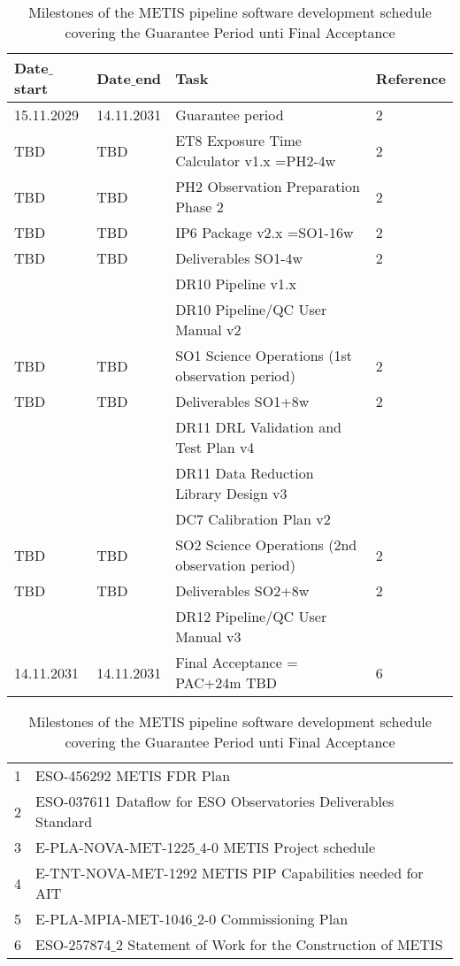 \begin{table}[h!]
    \caption[Development schedule]{Milestones of the METIS pipeline software development schedule covering the Guarantee Period unti Final Acceptance}
  \label{tab:development_schedule3}

\centering
\scriptsize
\begin{tabularx}{\textwidth}{llll}

\hline
Date$\_$start &	Date$\_$end   &	Task                            &		Reference \\
\hline\hline
15.11.2029 & 14.11.2031 & Guarantee period 					               & 2 \\
\hline
TBD    & TBD   & ET8 Exposure Time Calculator v1.x =PH2-4w		           & 2 \\
\hline
TBD    & TBD   & PH2 Observation Preparation Phase 2    		           & 2 \\
\hline
TBD    & TBD   & IP6 Package v2.x =SO1-16w				                   & 2 \\
\hline
TBD    & TBD   & Deliverables SO1-4w                                & 2 \\
   &           & DR10 Pipeline v1.x					             &	\\
   &		    & DR10 Pipeline/QC User Manual v2		    	     &	\\
\hline
TBD    & TBD   & SO1 Science Operations (1st observation period) 	& 2 \\
\hline
TBD    & TBD   & Deliverables SO1+8w                                & 2 \\
   &	 	    & DR11 DRL Validation and Test Plan v4	  		     &	\\
   &		    & DR11 Data Reduction Library Design v3	  		     &	\\
   &		    & DC7 Calibration Plan v2					         &	\\
\hline
TBD    & TBD   & SO2 Science Operations (2nd observation period) 	& 2 \\
\hline
TBD    & TBD   & Deliverables SO2+8w                                & 2 \\
   &		    & DR12 Pipeline/QC User Manual v3				     &	\\
\hline
14.11.2031 & 14.11.2031 & Final Acceptance  = PAC+24m  TBD			& 6 \\
\hline\hline
\end{tabularx}			
\tiny
\begin{tabularx}{\textwidth}{ll}
1 & ESO-456292 METIS FDR Plan  \\
2 & ESO-037611 Dataflow for ESO Observatories Deliverables Standard \\
3 & E-PLA-NOVA-MET-1225$\_$4-0 METIS Project schedule \\
4 & E-TNT-NOVA-MET-1292 METIS PIP Capabilities needed for AIT \\ 
5 & E-PLA-MPIA-MET-1046$\_$2-0 Commissioning Plan \\
6 & ESO-257874$\_$2 Statement of Work for the Construction of METIS \\
\end{tabularx} 
\end{table}


